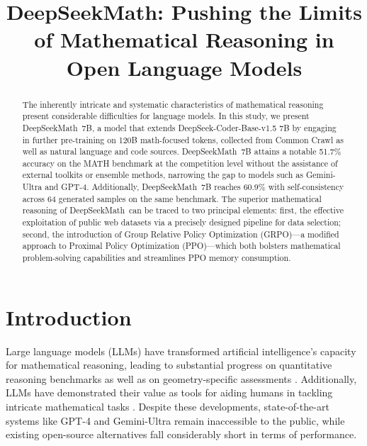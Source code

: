 \title{DeepSeekMath: Pushing the Limits of Mathematical Reasoning in Open Language Models}

\begin{abstract}
The inherently intricate and systematic characteristics of mathematical reasoning present considerable difficulties for language models. In this study, we present DeepSeekMath~7B, a model that extends DeepSeek-Coder-Base-v1.5 7B by engaging in further pre-training on 120B math-focused tokens, collected from Common Crawl as well as natural language and code sources. DeepSeekMath~7B attains a notable 51.7\% accuracy on the MATH benchmark at the competition level without the assistance of external toolkits or ensemble methods, narrowing the gap to models such as Gemini-Ultra and GPT-4. Additionally, DeepSeekMath~7B reaches 60.9\% with self-consistency across 64 generated samples on the same benchmark. The superior mathematical reasoning of DeepSeekMath~can be traced to two principal elements: first, the effective exploitation of public web datasets via a precisely designed pipeline for data selection; second, the introduction of Group Relative Policy Optimization (GRPO)—a modified approach to Proximal Policy Optimization (PPO)—which both bolsters mathematical problem-solving capabilities and streamlines PPO memory consumption.
\end{abstract}

\section{Introduction}

Large language models (LLMs) have transformed artificial intelligence's capacity for mathematical reasoning, leading to substantial progress on quantitative reasoning benchmarks \citep{MATH} as well as on geometry-specific assessments \citep{trinh2024solving}. Additionally, LLMs have demonstrated their value as tools for aiding humans in tackling intricate mathematical tasks \citep{tao}. Despite these developments, state-of-the-art systems like GPT-4 \citep{gpt4} and Gemini-Ultra \citep{gemini} remain inaccessible to the public, while existing open-source alternatives fall considerably short in terms of performance.

